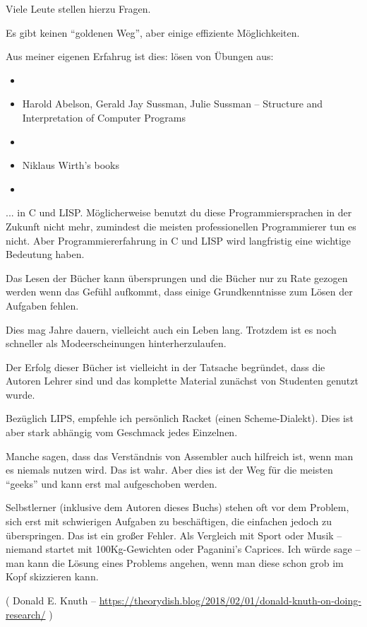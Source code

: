 Viele Leute stellen hierzu Fragen.

Es gibt keinen ``goldenen Weg'', aber einige effiziente Möglichkeiten.

Aus meiner eigenen Erfahrug ist dies: lösen von Übungen aus:

\begin{itemize}
	\item \KRBook
	\item Harold Abelson, Gerald Jay Sussman, Julie Sussman -- Structure and Interpretation of Computer Programs
	\item \TAOCP
	\item Niklaus Wirth's books
	\item \RobPikePractice
\end{itemize}

... in C und LISP.
Möglicherweise benutzt du diese Programmiersprachen in der Zukunft nicht mehr, zumindest die meisten professionellen Programmierer tun es nicht. Aber Programmiererfahrung in C und LISP wird langfristig eine wichtige Bedeutung haben.

Das Lesen der Bücher kann übersprungen und die Bücher nur zu Rate gezogen werden wenn das Gefühl aufkommt, dass einige Grundkenntnisse zum Lösen der Aufgaben fehlen.

Dies mag Jahre dauern, vielleicht auch ein Leben lang. Trotzdem ist es noch schneller als Modeerscheinungen hinterherzulaufen.

Der Erfolg dieser Bücher ist vielleicht in der Tatsache begründet, dass die Autoren Lehrer sind und das komplette Material zunächst von Studenten genutzt wurde.

Bezüglich LIPS, empfehle ich persönlich Racket (einen Scheme-Dialekt). Dies ist aber stark abhängig vom Geschmack jedes Einzelnen.

Manche sagen, dass das Verständnis von Assembler auch hilfreich ist, wenn man es niemals nutzen wird.
Das ist wahr.
Aber dies ist der Weg für die meisten ``geeks'' und kann erst mal aufgeschoben werden.

Selbstlerner (inklusive dem Autoren dieses Buchs) stehen oft vor dem Problem, sich erst mit schwierigen Aufgaben zu beschäftigen, die einfachen jedoch zu überspringen.
Das ist ein großer Fehler.
Als Vergleich mit Sport oder Musik -- niemand startet mit 100Kg-Gewichten oder Paganini's Caprices.
Ich würde sage -- man kann die Lösung eines Problems angehen, wenn man diese schon grob im Kopf skizzieren kann.


( Donald E. Knuth -- \url{https://theorydish.blog/2018/02/01/donald-knuth-on-doing-research/} )

